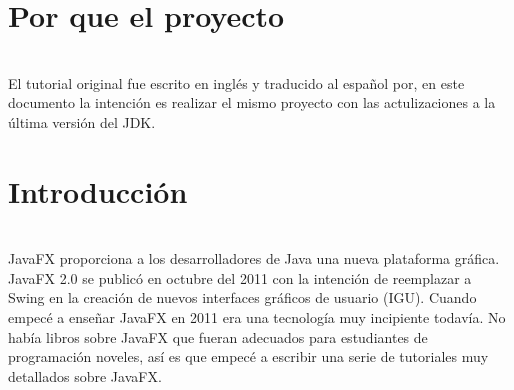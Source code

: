 \section{Por que el proyecto}\\
El tutorial original fue escrito en inglés y traducido al español por, en este documento la intención es realizar el mismo proyecto con las actulizaciones a la última versión del JDK.
\\

\section{Introducción}\\
JavaFX proporciona a los desarrolladores de Java una nueva plataforma gráfica. JavaFX 2.0 se publicó en octubre del 2011 con la intención de reemplazar a Swing en la creación de nuevos interfaces gráficos de usuario (IGU). Cuando empecé a enseñar JavaFX en 2011 era una tecnología muy incipiente todavía. No había libros sobre JavaFX que fueran adecuados para estudiantes de programación noveles, así es que empecé a escribir una serie de tutoriales muy detallados sobre JavaFX.